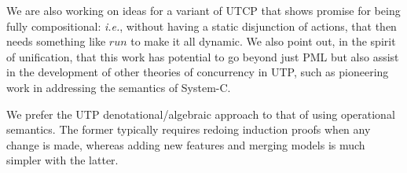 We are also working on ideas for a variant of UTCP
that shows promise for being fully compositional:
\emph{i.e.}, without having a static disjunction
of actions, that then needs something like $run$
to make it all dynamic.
We also point out, in the spirit of unification,
that this work has potential to go beyond just PML
but also assist in the development of other theories
of concurrency in UTP,
such as pioneering work in \cite{journals/fac/ZhuHQB15}
addressing the semantics of System-C.

We prefer the UTP denotational/algebraic approach
to that of using operational semantics.
The former typically requires redoing induction proofs
when any change is made,
whereas adding new features and merging models is
much simpler with the latter\cite[p277]{Hoare-He98}.
